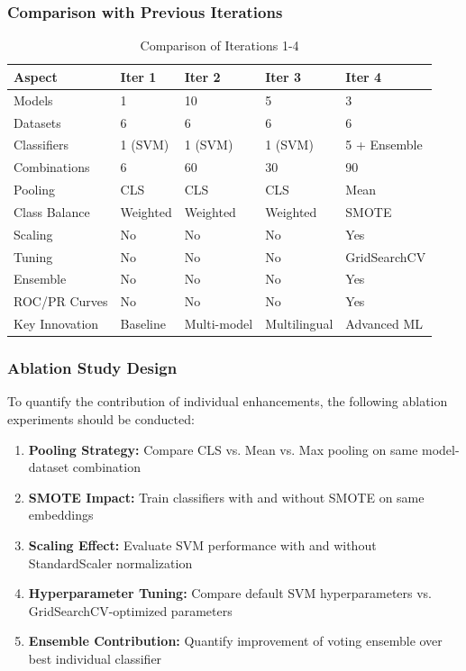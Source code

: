 \documentclass[11pt, titlepage, bibliography=totoc]{scrreprt}
\begin{document}
\subsubsection{Comparison with Previous Iterations}

\begin{table}[htbp]
\centering
\small
\begin{tabular}{@{}lllll@{}}
\toprule
\textbf{Aspect} & \textbf{Iter 1} & \textbf{Iter 2} & \textbf{Iter 3} & \textbf{Iter 4} \\
\midrule
Models & 1 & 10 & 5 & 3 \\
Datasets & 6 & 6 & 6 & 6 \\
Classifiers & 1 (SVM) & 1 (SVM) & 1 (SVM) & 5 + Ensemble \\
Combinations & 6 & 60 & 30 & 90 \\
Pooling & CLS & CLS & CLS & Mean \\
Class Balance & Weighted & Weighted & Weighted & SMOTE \\
Scaling & No & No & No & Yes \\
Tuning & No & No & No & GridSearchCV \\
Ensemble & No & No & No & Yes \\
ROC/PR Curves & No & No & No & Yes \\
Key Innovation & Baseline & Multi-model & Multilingual & Advanced ML \\
\bottomrule
\end{tabular}
\caption{Comparison of Iterations 1-4}
\label{tab:iteration_comparison_4}
\end{table}

\subsubsection{Ablation Study Design}

To quantify the contribution of individual enhancements, the following ablation experiments should be conducted:

\begin{enumerate}
    \item \textbf{Pooling Strategy:} Compare CLS vs. Mean vs. Max pooling on same model-dataset combination
    \item \textbf{SMOTE Impact:} Train classifiers with and without SMOTE on same embeddings
    \item \textbf{Scaling Effect:} Evaluate SVM performance with and without StandardScaler normalization
    \item \textbf{Hyperparameter Tuning:} Compare default SVM hyperparameters vs. GridSearchCV-optimized parameters
    \item \textbf{Ensemble Contribution:} Quantify improvement of voting ensemble over best individual classifier
\end{enumerate}
\end{document}
